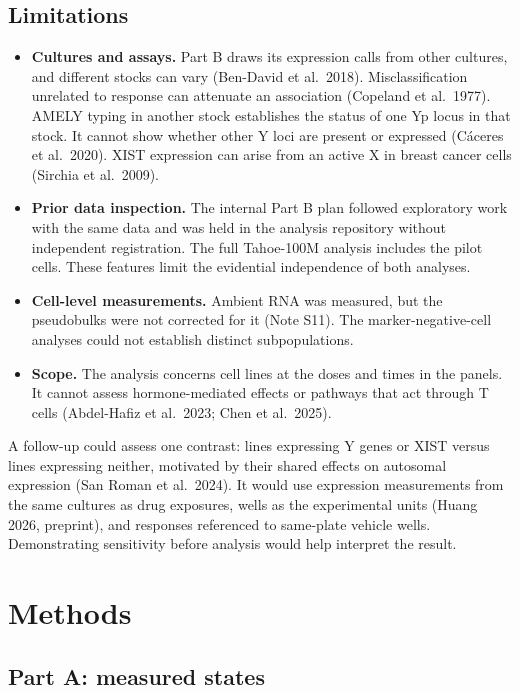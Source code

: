 \documentclass[
  11pt,
  letterpaper,
]{article}
\providecommand{\tightlist}{%
  \setlength{\itemsep}{0pt}\setlength{\parskip}{0pt}}
\begin{document}
\subsection{Limitations}\label{limitations}

\begin{itemize}
\tightlist
\item
  \textbf{Cultures and assays.} Part B draws its expression calls from
  other cultures, and different stocks can vary (Ben-David et al.~2018).
  Misclassification unrelated to response can attenuate an association
  (Copeland et al.~1977). AMELY typing in another stock establishes the
  status of one Yp locus in that stock. It cannot show whether other Y
  loci are present or expressed (Cáceres et al.~2020). XIST expression
  can arise from an active X in breast cancer cells (Sirchia et
  al.~2009).
\item
  \textbf{Prior data inspection.} The internal Part B plan followed
  exploratory work with the same data and was held in the analysis
  repository without independent registration. The full Tahoe-100M
  analysis includes the pilot cells. These features limit the evidential
  independence of both analyses.
\item
  \textbf{Cell-level measurements.} Ambient RNA was measured, but the
  pseudobulks were not corrected for it (Note S11). The
  marker-negative-cell analyses could not establish distinct
  subpopulations.
\item
  \textbf{Scope.} The analysis concerns cell lines at the doses and
  times in the panels. It cannot assess hormone-mediated effects or
  pathways that act through T cells (Abdel-Hafiz et al.~2023; Chen et
  al.~2025).
\end{itemize}

A follow-up could assess one contrast: lines expressing Y genes or XIST
versus lines expressing neither, motivated by their shared effects on
autosomal expression (San Roman et al.~2024). It would use expression
measurements from the same cultures as drug exposures, wells as the
experimental units (Huang 2026, preprint), and responses referenced to
same-plate vehicle wells. Demonstrating sensitivity before analysis
would help interpret the result.

\section{Methods}\label{methods}

\subsection{Part A: measured states}\label{part-a-measured-states}
\end{document}
